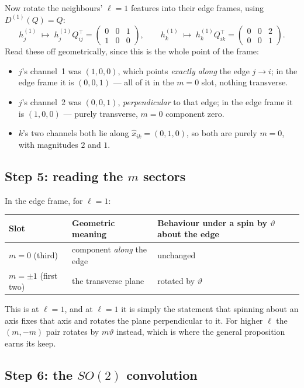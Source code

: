 \documentclass[11pt,a4paper]{report}
\theoremstyle{definition}
\theoremstyle{remark}
\begin{document}
Now rotate the neighbours' $\ell=1$ features into their edge frames, using
$D^{(1)}(Q)=Q$:
\[
h^{(1)}_j\;\longmapsto\;h^{(1)}_jQ_{ij}^\top=\begin{pmatrix}0&0&1\\ 1&0&0\end{pmatrix},
\qquad
h^{(1)}_k\;\longmapsto\;h^{(1)}_kQ_{ik}^\top=\begin{pmatrix}0&0&2\\ 0&0&1\end{pmatrix} .
\]
Read these off geometrically, since this is the whole point of the frame:
\begin{itemize}[nosep]
\item $j$'s channel~1 was $(1,0,0)$, which points \emph{exactly along} the
      edge $j\to i$; in the edge frame it is $(0,0,1)$ --- all of it in the
      $m=0$ slot, nothing transverse.
\item $j$'s channel~2 was $(0,0,1)$, \emph{perpendicular} to that edge; in the
      edge frame it is $(1,0,0)$ --- purely transverse, $m=0$ component zero.
\item $k$'s two channels both lie along $\hat x_{ik}=(0,1,0)$, so both are
      purely $m=0$, with magnitudes $2$ and $1$.
\end{itemize}

\subsection{Step 5: reading the $m$ sectors}
\label{sec:toy-m-sectors}

In the edge frame, for $\ell=1$:
\begin{center}
\begin{tabular}{lll}
\toprule
Slot & Geometric meaning & Behaviour under a spin by $\vartheta$ about the edge \\
\midrule
$m=0$ (third) & component \emph{along} the edge & unchanged \\
$m=\pm1$ (first two) & the transverse plane & rotated by $\vartheta$ \\
\bottomrule
\end{tabular}
\end{center}
This is  at $\ell=1$, and at $\ell=1$ it is simply
the statement that spinning about an axis fixes that axis and rotates the
plane perpendicular to it. For higher $\ell$ the $(m,-m)$ pair rotates by
$m\vartheta$ instead, which is where the general proposition earns its
keep.

\subsection{Step 6: the $SO(2)$ convolution}
\end{document}
